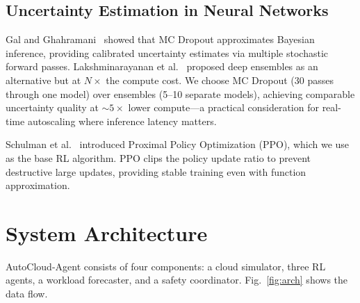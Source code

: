 \documentclass[conference]{IEEEtran}
\begin{document}
\subsection{Uncertainty Estimation in Neural Networks}

Gal and Ghahramani~\cite{gal2016dropout} showed that MC Dropout approximates
Bayesian inference, providing calibrated uncertainty estimates via multiple
stochastic forward passes.  Lakshminarayanan et al.~\cite{lakshminarayanan2017simple}
proposed deep ensembles as an alternative but at $N\times$ the compute cost.
We choose MC Dropout (30 passes through one model) over ensembles (5--10 separate
models), achieving comparable uncertainty quality at ${\sim}5\times$ lower
compute---a practical consideration for real-time autoscaling where inference
latency matters.

Schulman et al.~\cite{schulman2017ppo} introduced Proximal Policy Optimization
(PPO), which we use as the base RL algorithm. PPO clips the policy update ratio
to prevent destructive large updates, providing stable training even with
function approximation.

\section{System Architecture}

AutoCloud-Agent consists of four components: a cloud simulator, three RL agents,
a workload forecaster, and a safety coordinator. Fig.~\ref{fig:arch} shows
the data flow.
\end{document}
